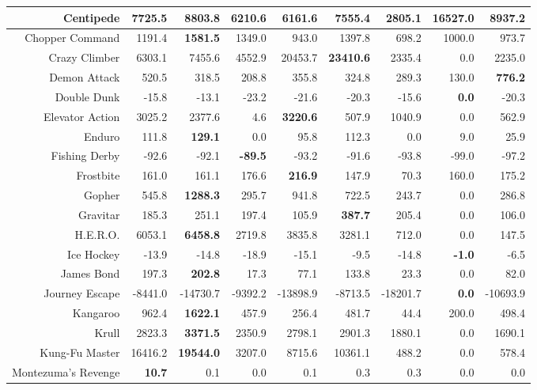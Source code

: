 \documentclass[twoside,11pt]{article}
\newcommand{\gamename}[1]{{\sc #1}}
\begin{document}
\begin{table}[h!]
\begin{center}
\begin{tabular}{|r|r|r|r|r|r||r|r|r|}
\hline
\gamename{Centipede} & 7725.5& 8803.8& 6210.6& 6161.6& 7555.4& 2805.1& \textbf { 16527.0 }& 8937.2\\
\hline
\gamename{Chopper Command} & 1191.4& \textbf { 1581.5 }& 1349.0& 943.0& 1397.8& 698.2& 1000.0& 973.7\\
\hline
\gamename{Crazy Climber} & 6303.1& 7455.6& 4552.9& 20453.7& \textbf { 23410.6 }& 2335.4& 0.0& 2235.0\\
\hline
\gamename{Demon Attack} & 520.5& 318.5& 208.8& 355.8& 324.8& 289.3& 130.0& \textbf { 776.2 }\\
\hline
\gamename{Double Dunk} & -15.8& -13.1& -23.2& -21.6& -20.3& -15.6& \textbf { 0.0 }& -20.3\\
\hline
\gamename{Elevator Action} & 3025.2& 2377.6& 4.6& \textbf { 3220.6 }& 507.9& 1040.9& 0.0& 562.9\\
\hline
\gamename{Enduro} & 111.8& \textbf { 129.1 }& 0.0& 95.8& 112.3& 0.0& 9.0& 25.9\\
\hline
\gamename{Fishing Derby} & -92.6& -92.1& \textbf { -89.5 }& -93.2& -91.6& -93.8& -99.0& -97.2\\
\hline
\gamename{Frostbite} & 161.0& 161.1& 176.6& \textbf { 216.9 }& 147.9& 70.3& 160.0& 175.2\\
\hline
\gamename{Gopher} & 545.8& \textbf { 1288.3 }& 295.7& 941.8& 722.5& 243.7& 0.0& 286.8\\
\hline
\gamename{Gravitar} & 185.3& 251.1& 197.4& 105.9& \textbf { 387.7 }& 205.4& 0.0& 106.0\\
\hline
\gamename{H.E.R.O.} & 6053.1& \textbf { 6458.8 }& 2719.8& 3835.8& 3281.1& 712.0& 0.0& 147.5\\
\hline
\gamename{Ice Hockey} & -13.9& -14.8& -18.9& -15.1& -9.5& -14.8& \textbf { -1.0 }& -6.5\\
\hline
\gamename{James Bond} & 197.3& \textbf { 202.8 }& 17.3& 77.1& 133.8& 23.3& 0.0& 82.0\\
\hline
\gamename{Journey Escape} & -8441.0& -14730.7& -9392.2& -13898.9& -8713.5& -18201.7& \textbf { 0.0 }& -10693.9\\
\hline
\gamename{Kangaroo} & 962.4& \textbf { 1622.1 }& 457.9& 256.4& 481.7& 44.4& 200.0& 498.4\\
\hline
\gamename{Krull} & 2823.3& \textbf { 3371.5 }& 2350.9& 2798.1& 2901.3& 1880.1& 0.0& 1690.1\\
\hline
\gamename{Kung-Fu Master} & 16416.2& \textbf { 19544.0 }& 3207.0& 8715.6& 10361.1& 488.2& 0.0& 578.4\\
\hline
\gamename{Montezuma's Revenge} & \textbf { 10.7 }& 0.1& 0.0& 0.1& 0.3& 0.3& 0.0& 0.0\\

\end{tabular}
\end{center}
\end{table}
\end{document}
